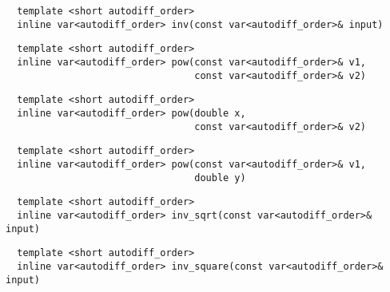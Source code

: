 \begin{tcolorbox}[colback=white,colframe=gray90, coltitle=black,boxrule=3pt,
fonttitle=\bfseries,title=Inverse]

\begin{verbatim}
  template <short autodiff_order>
  inline var<autodiff_order> inv(const var<autodiff_order>& input)
\end{verbatim}

\end{tcolorbox}

\begin{tcolorbox}[colback=white,colframe=gray90, coltitle=black,boxrule=3pt,
fonttitle=\bfseries,title=Power]

\begin{verbatim}
  template <short autodiff_order>
  inline var<autodiff_order> pow(const var<autodiff_order>& v1,
                                 const var<autodiff_order>& v2)
\end{verbatim}

\begin{verbatim}
  template <short autodiff_order>
  inline var<autodiff_order> pow(double x,
                                 const var<autodiff_order>& v2)
\end{verbatim}

\begin{verbatim}
  template <short autodiff_order>
  inline var<autodiff_order> pow(const var<autodiff_order>& v1,
                                 double y)
\end{verbatim}

\end{tcolorbox}

\begin{tcolorbox}[colback=white,colframe=gray90, coltitle=black,boxrule=3pt,
fonttitle=\bfseries,title=Square Root]

\begin{verbatim}
  template <short autodiff_order>
  inline var<autodiff_order> inv_sqrt(const var<autodiff_order>& input)
\end{verbatim}

\end{tcolorbox}

\begin{tcolorbox}[colback=white,colframe=gray90, coltitle=black,boxrule=3pt,
fonttitle=\bfseries,title=Square]

\begin{verbatim}
  template <short autodiff_order>
  inline var<autodiff_order> inv_square(const var<autodiff_order>& input)
\end{verbatim}

\end{tcolorbox}

